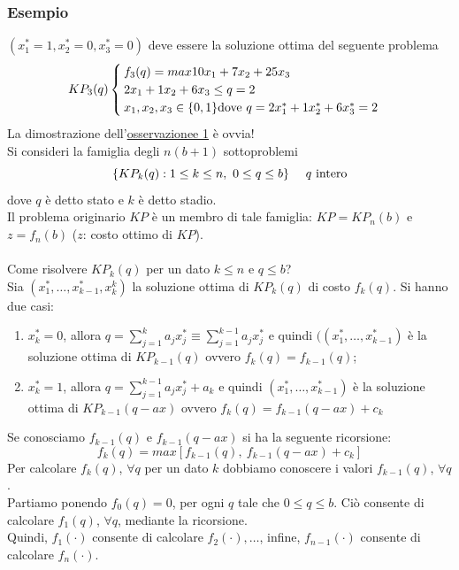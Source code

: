 \subsubsection{Esempio}
$(x_{1}^{*}=1,x_{2}^{*}=0,x_{3}^{*}=0)$ deve essere la soluzione ottima del seguente problema
\begin{equation}
	KP_{3}(q)
	\begin{cases}
		f_{3}(q)=max 10x_{1}+7x_{2}+25x_{3} \\
		2x_{1}+1x_{2}+6x_{3}\le q=2 \\
		x_{1},x_{2},x_{3}\in\{0,1\}
		\textnormal{dove }q=2x_{1}^{*}+1x_{2}^{*}+6x_{3}^{*}=2
	\end{cases}
\end{equation}
La dimostrazione dell'\hyperref[ss:osservazione_1]{osservazionee 1} è ovvia!\\
Si consideri la famiglia degli $n(b+1)$ sottoproblemi
\begin{equation}
	\{KP_{k}(q):1\le k\le n,\ 0\le q\le b\}\ \ \ \ q\textnormal{ intero}
\end{equation}
dove $q$ è detto stato e $k$ è detto stadio.\\
Il problema originario $KP$ è un membro di tale famiglia: $KP=KP_{n}(b)$ e $z=f_{n}(b)$ ($z$: costo ottimo di $KP$).\\\\
Come risolvere $KP_{k}(q)$ per un dato $k\le n$ e $q\le b$?\\
Sia $(x_{1}^{*},\dots,x_{k-1}^{*},x_{k}^{k})$ la soluzione ottima di $KP_{k}(q)$ di costo $f_{k}(q)$. Si hanno due casi:
\begin{enumerate}
	\item $x_{k}^{*}=0$, allora $q=\sum_{j=1}^{k}a_{j}x_{j}^{*}\equiv\sum_{j=1}^{k-1}a_{j}x_{j}^{*}$ e quindi $((x_{1}^{*},\dots,x_{k-1}^{*})$ è la soluzione ottima di $KP_{k-1}(q)$ ovvero $f_{k}(q)=f_{k-1}(q)$;
	\item $x_{k}^{*}=1$, allora $q=\sum_{j=1}^{k-1}a_{j}x_{j}^{*}+a_{k}$ e quindi $(x_{1}^{*},\dots,x_{k-1}^{*})$ è la soluzione ottima di $KP_{k-1}(q-ax)$ ovvero $f_{k}(q)=f_{k-1}(q-ax)+c_{k}$
\end{enumerate}
Se conosciamo $f_{k-1}(q)$ e $f_{k-1}(q-ax)$ si ha la seguente ricorsione:
\begin{equation}
	f_{k}(q)=max[f_{k-1}(q),\ f_{k-1}(q-ax)+c_{k}]
\end{equation}
Per calcolare $f_{k}(q)$, $\forall q$ per un dato $k$ dobbiamo conoscere i valori $f_{k-1}(q)$, $\forall q$.\\
Partiamo ponendo $f_{0}(q)=0$, per ogni $q$ tale che $0\le q\le b$. Ciò consente di calcolare $f_{1}(q)$, $\forall q$, mediante la ricorsione.\\
Quindi, $f_{1}(\cdot)$ consente di calcolare $f_{2}(\cdot),\dots$, infine, $f_{n-1}(\cdot)$ consente di calcolare $f_{n}(\cdot)$.
